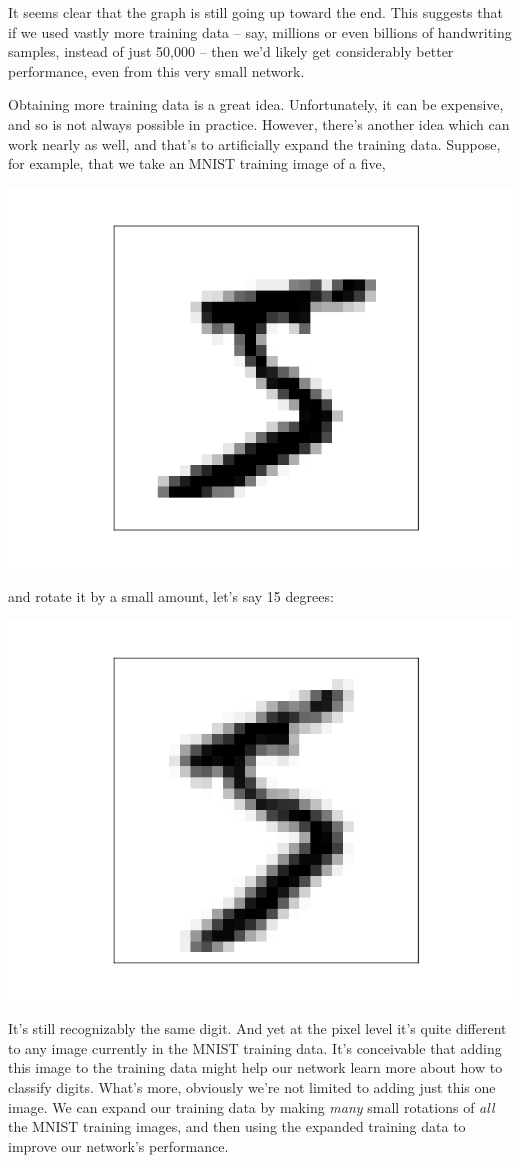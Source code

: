 \documentclass[a4paper,twoside,10pt]{book}
\begin{document}
It seems clear that the graph is still going up toward the end. This suggests that if we used vastly more training data -- say, millions or even billions of handwriting samples, instead of just 50,000 -- then we'd likely get considerably better performance, even from this very small network.

Obtaining more training data is a great idea. Unfortunately, it can be expensive, and so is not always possible in practice. However, there's another idea which can work nearly as well, and that's to artificially expand the training data. Suppose, for example, that we take an MNIST training image of a five,
\begin{center}
	\includegraphics[width=0.3\linewidth]{figures/ch3/more_data_5}
\end{center}
and rotate it by a small amount, let's say 15 degrees:
\begin{center}
	\includegraphics[width=0.3\linewidth]{figures/ch3/more_data_rotated_5}
\end{center}
It's still recognizably the same digit. And yet at the pixel level it's quite different to any image currently in the MNIST training data. It's conceivable that adding this image to the training data might help our network learn more about how to classify digits. What's more, obviously we're not limited to adding just this one image. We can expand our training data by making \textit{many} small rotations of \textit{all} the MNIST training images, and then using the expanded training data to improve our network's performance.
\end{document}
